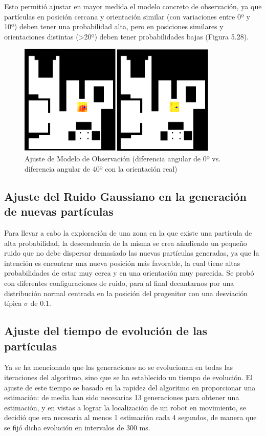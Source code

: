 Esto permitió ajustar en mayor medida el modelo concreto de observación, ya que partículas en posición cercana y orientación similar (con variaciones entre 0º y 10º) deben tener una probabilidad alta, pero en posiciones similares y orientaciones distintas (>20º) deben tener probabilidades bajas (Figura 5.28).

\begin{figure}[H]
		\begin{center}
		\includegraphics[width=0.85\textwidth]{figures/slidermap.png}
		\caption{Ajuste de Modelo de Observación (diferencia angular de 0º vs. diferencia angular de 40º con la orientación real)}
		\label{fig.slidermap}
		\end{center}
	\end{figure}
	
\subsection{Ajuste del Ruido Gaussiano en la generación de nuevas partículas}
Para llevar a cabo la exploración de una zona en la que existe una partícula de alta probabilidad, la descendencia de la misma se crea añadiendo un pequeño ruido que no debe dispersar demasiado las nuevas partículas generadas, ya que la intención es encontrar una nueva posición más favorable, la cual tiene altas probabilidades de estar muy cerca y en una orientación muy parecida. Se probó con diferentes configuraciones de ruido, para al final decantarnos por una distribución normal centrada en la posición del progenitor con una desviación típica $\sigma$ de 0.1.

\subsection{Ajuste del tiempo de evolución de las partículas}
Ya se ha mencionado que las generaciones no se evolucionan en todas las iteraciones del algoritmo, sino que se ha establecido un tiempo de evolución. El ajuste de este tiempo se basado en la rapidez del algoritmo en proporcionar una estimación: de media han sido necesarias 13 generaciones para obtener una estimación, y en vistas a lograr la localización de un robot en movimiento, se decidió que era necesaria al menos 1 estimación cada 4 segundos, de manera que se fijó dicha evolución en intervalos de 300 ms. 

